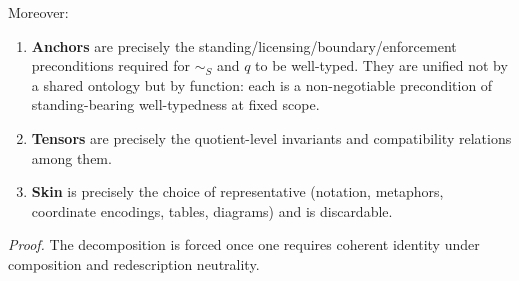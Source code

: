\documentclass[12pt]{article}
\theoremstyle{plain}
\begin{document}
Moreover:

\begin{enumerate}[leftmargin=*]
\item \textbf{Anchors} are precisely the standing/licensing/boundary/enforcement preconditions required for $\sim_S$ and $q$ to be well-typed. They are unified not by a shared ontology but by function: each is a non-negotiable precondition of standing-bearing well-typedness at fixed scope.
\item \textbf{Tensors} are precisely the quotient-level invariants and compatibility relations among them.
\item \textbf{Skin} is precisely the choice of representative (notation, metaphors, coordinate encodings, tables, diagrams) and is discardable.
\end{enumerate}

\textit{Proof.} The decomposition is forced once one requires coherent identity under composition and redescription neutrality.
\end{document}
